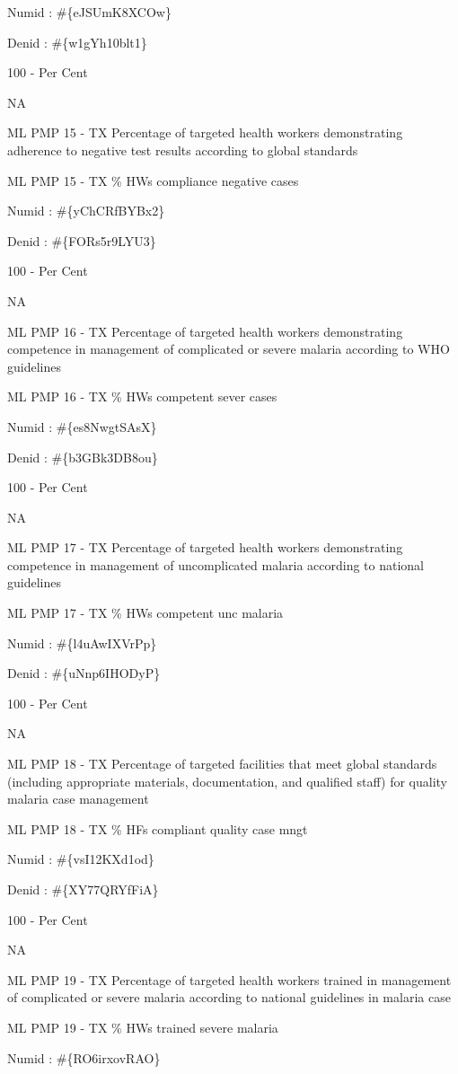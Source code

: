 \documentclass[]{book}
\begin{document}
Numid : \#\{eJSUmK8XCOw\}

Denid : \#\{w1gYh10blt1\}

100 - Per Cent

NA

ML PMP 15 - TX Percentage of targeted health workers demonstrating adherence to negative test results according to global standards

ML PMP 15 - TX \% HWs compliance negative cases

Numid : \#\{yChCRfBYBx2\}

Denid : \#\{FORs5r9LYU3\}

100 - Per Cent

NA

ML PMP 16 - TX Percentage of targeted health workers demonstrating competence in management of complicated or severe malaria according to WHO guidelines

ML PMP 16 - TX \% HWs competent sever cases

Numid : \#\{es8NwgtSAsX\}

Denid : \#\{b3GBk3DB8ou\}

100 - Per Cent

NA

ML PMP 17 - TX Percentage of targeted health workers demonstrating competence in management of uncomplicated malaria according to national guidelines

ML PMP 17 - TX \% HWs competent unc malaria

Numid : \#\{l4uAwIXVrPp\}

Denid : \#\{uNnp6IHODyP\}

100 - Per Cent

NA

ML PMP 18 - TX Percentage of targeted facilities that meet global standards (including appropriate materials, documentation, and qualified staff) for quality malaria case management

ML PMP 18 - TX \% HFs compliant quality case mngt

Numid : \#\{vsI12KXd1od\}

Denid : \#\{XY77QRYfFiA\}

100 - Per Cent

NA

ML PMP 19 - TX Percentage of targeted health workers trained in management of complicated or severe malaria according to national guidelines in malaria case

ML PMP 19 - TX \% HWs trained severe malaria

Numid : \#\{RO6irxovRAO\}
\end{document}

